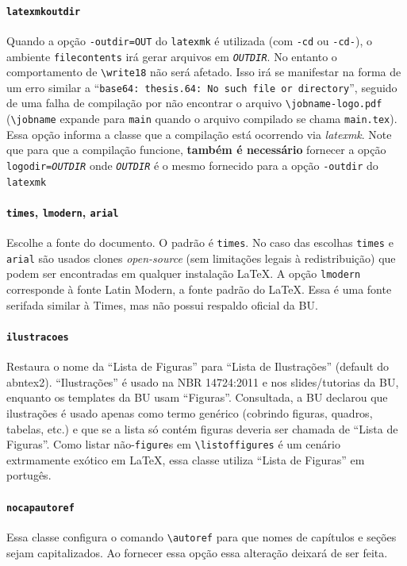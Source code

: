 \documentclass[embeddedlogo]{ufsc-thesis-rn46-2019}
\newcommand{\lacmd}[1]{\texttt{\textbackslash{}#1}}
\begin{document}
\paragraph*{\texttt{latexmkoutdir}} Quando a opção \texttt{-outdir=OUT} do
\texttt{latexmk} é utilizada (com \texttt{-cd} ou \texttt{-cd-}), o ambiente
\texttt{filecontents} irá gerar arquivos em \texttt{\emph{OUTDIR}}. No entanto o
comportamento de \lacmd{write18} não será afetado. Isso irá se manifestar na forma de
um erro similar a ``\texttt{base64: thesis.64: No such file or directory}'',
seguido de uma falha de compilação por não encontrar o arquivo
\lacmd{jobname-logo.pdf} (\lacmd{jobname} expande para \texttt{main} quando o
arquivo compilado se chama \texttt{main.tex}). Essa opção informa a classe que a
compilação está ocorrendo via \emph{latexmk}. Note que para que a compilação
funcione, \textbf{também é necessário} fornecer a opção
\texttt{logodir=\emph{OUTDIR}} onde \texttt{\emph{OUTDIR}} é o mesmo fornecido
para a opção \texttt{-outdir} do \texttt{latexmk}

\paragraph*{\texttt{times}, \texttt{lmodern}, \texttt{arial}} Escolhe a fonte
do documento. O padrão é \texttt{times}. No caso das escolhas \texttt{times} e
\texttt{arial} são usados clones \emph{open-source} (sem limitações legais à
redistribuição) que podem ser encontradas em qualquer instalação \LaTeX. A
opção \texttt{lmodern} corresponde à fonte Latin Modern, a fonte padrão do
\LaTeX. Essa é uma fonte serifada similar à Times, mas não possui respaldo
oficial da BU.

\paragraph*{\texttt{ilustracoes}} Restaura o nome da ``Lista de Figuras'' para
``Lista de Ilustrações'' (default do abntex2). ``Ilustrações'' é usado na NBR
14724:2011 e nos slides/tutorias da BU, enquanto os templates da BU usam
``Figuras''. Consultada, a BU declarou que ilustrações é usado apenas como termo
genérico (cobrindo figuras, quadros, tabelas, etc.) e que se a lista só contém
figuras deveria ser chamada de ``Lista de Figuras''. Como listar
não-\texttt{figure}s em \lacmd{listoffigures} é um cenário extrmamente exótico
em \LaTeX, essa classe utiliza ``Lista de Figuras'' em portugês.

\paragraph*{\texttt{nocapautoref}} Essa classe configura o comando
\lacmd{autoref} para que nomes de capítulos e seções sejam capitalizados. Ao
fornecer essa opção essa alteração deixará de ser feita.
\end{document}
